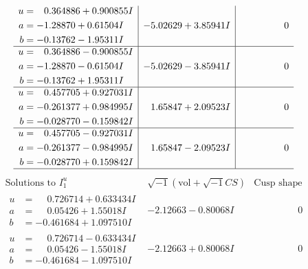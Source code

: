 \documentclass[1p]{elsarticle_modified}
\theoremstyle{definition}
\newcommand{\I}{\sqrt{-1}}
\begin{document}
$$\begin{array}{c|c|c}
\begin{aligned}
u &= \phantom{-}0.364886 + 0.900855 I \\
a &= -1.28870 + 0.61504 I \\
b &= -0.13762 - 1.95311 I\end{aligned}
 & -5.02629 + 3.85941 I & \phantom{-0.000000 } 0 \\ \hline\begin{aligned}
u &= \phantom{-}0.364886 - 0.900855 I \\
a &= -1.28870 - 0.61504 I \\
b &= -0.13762 + 1.95311 I\end{aligned}
 & -5.02629 - 3.85941 I & \phantom{-0.000000 } 0 \\ \hline\begin{aligned}
u &= \phantom{-}0.457705 + 0.927031 I \\
a &= -0.261377 + 0.984995 I \\
b &= -0.028770 - 0.159842 I\end{aligned}
 & \phantom{-}1.65847 + 2.09523 I & \phantom{-0.000000 } 0 \\ \hline\begin{aligned}
u &= \phantom{-}0.457705 - 0.927031 I \\
a &= -0.261377 - 0.984995 I \\
b &= -0.028770 + 0.159842 I\end{aligned}
 & \phantom{-}1.65847 - 2.09523 I & \phantom{-0.000000 } 0\\
 \hline 
 \end{array}$$\newpage$$\begin{array}{c|c|c}  
\text{Solutions to }I^u_{1}& \I (\text{vol} + \sqrt{-1}CS) & \text{Cusp shape}\\
 \hline 
\begin{aligned}
u &= \phantom{-}0.726714 + 0.633434 I \\
a &= \phantom{-}0.05426 + 1.55018 I \\
b &= -0.461684 + 1.097510 I\end{aligned}
 & -2.12663 - 0.80068 I & \phantom{-0.000000 } 0 \\ \hline\begin{aligned}
u &= \phantom{-}0.726714 - 0.633434 I \\
a &= \phantom{-}0.05426 - 1.55018 I \\
b &= -0.461684 - 1.097510 I\end{aligned}
 & -2.12663 + 0.80068 I & \phantom{-0.000000 } 0 \\ \hline\begin{aligned}

\end{aligned}
\end{array}$$
\end{document}
